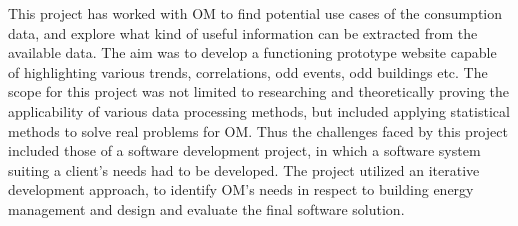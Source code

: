 This project has worked with OM to find potential use cases of the consumption data, and explore what kind of useful information can be extracted from the available data. The aim was to develop a functioning prototype website capable of highlighting various trends, correlations, odd events, odd buildings etc. The scope for this project was not limited to researching and theoretically proving the applicability of various data processing methods, but included applying statistical methods to solve real problems for OM. Thus the challenges faced by this project included those of a software development project, in which a software system suiting a client's needs had to be developed. The project utilized an iterative development approach, to identify OM's needs in respect to building energy management and design and evaluate the final software solution.